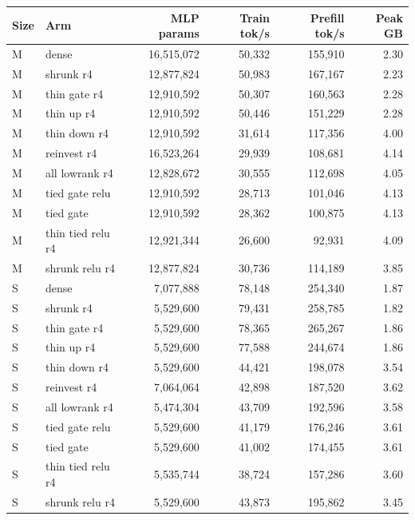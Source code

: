 \begin{tabular}{llrrrr}
\toprule
Size & Arm & MLP params & Train tok/s & Prefill tok/s & Peak GB \\
\midrule
M & dense & 16,515,072 & 50,332 & 155,910 & 2.30 \\
M & shrunk r4 & 12,877,824 & 50,983 & 167,167 & 2.23 \\
M & thin gate r4 & 12,910,592 & 50,307 & 160,563 & 2.28 \\
M & thin up r4 & 12,910,592 & 50,446 & 151,229 & 2.28 \\
M & thin down r4 & 12,910,592 & 31,614 & 117,356 & 4.00 \\
M & reinvest r4 & 16,523,264 & 29,939 & 108,681 & 4.14 \\
M & all lowrank r4 & 12,828,672 & 30,555 & 112,698 & 4.05 \\
M & tied gate relu & 12,910,592 & 28,713 & 101,046 & 4.13 \\
M & tied gate & 12,910,592 & 28,362 & 100,875 & 4.13 \\
M & thin tied relu r4 & 12,921,344 & 26,600 & 92,931 & 4.09 \\
M & shrunk relu r4 & 12,877,824 & 30,736 & 114,189 & 3.85 \\
\midrule
S & dense & 7,077,888 & 78,148 & 254,340 & 1.87 \\
S & shrunk r4 & 5,529,600 & 79,431 & 258,785 & 1.82 \\
S & thin gate r4 & 5,529,600 & 78,365 & 265,267 & 1.86 \\
S & thin up r4 & 5,529,600 & 77,588 & 244,674 & 1.86 \\
S & thin down r4 & 5,529,600 & 44,421 & 198,078 & 3.54 \\
S & reinvest r4 & 7,064,064 & 42,898 & 187,520 & 3.62 \\
S & all lowrank r4 & 5,474,304 & 43,709 & 192,596 & 3.58 \\
S & tied gate relu & 5,529,600 & 41,179 & 176,246 & 3.61 \\
S & tied gate & 5,529,600 & 41,002 & 174,455 & 3.61 \\
S & thin tied relu r4 & 5,535,744 & 38,724 & 157,286 & 3.60 \\
S & shrunk relu r4 & 5,529,600 & 43,873 & 195,862 & 3.45 \\
\bottomrule
\end{tabular}
